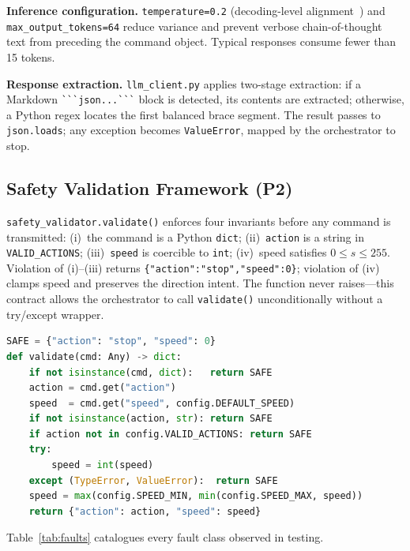 \documentclass[conference]{IEEEtran}
\begin{document}
\textbf{Inference configuration.}
\texttt{temperature=0.2} (decoding-level alignment~\cite{wei2022cot}) and
\texttt{max\_output\_tokens=64} reduce variance and prevent verbose
chain-of-thought text from preceding the command object.
Typical responses consume fewer than 15 tokens.

\textbf{Response extraction.}
\texttt{llm\_client.py} applies two-stage extraction: if a Markdown
\verb|```json...```| block is detected, its contents are extracted; otherwise,
a Python regex locates the first balanced brace segment.
The result passes to \texttt{json.loads}; any exception becomes
\texttt{ValueError}, mapped by the orchestrator to stop.

\subsection{Safety Validation Framework (P2)}
\label{sec:validator}

\texttt{safety\_validator.validate()} enforces four invariants
before any command is transmitted:
(i)~the command is a Python \texttt{dict};
(ii)~\texttt{action} is a string in \texttt{VALID\_ACTIONS};
(iii)~\texttt{speed} is coercible to \texttt{int};
(iv)~speed satisfies $0 \leq s \leq 255$.
Violation of (i)--(iii) returns \texttt{\{"action":"stop","speed":0\}};
violation of (iv) clamps speed and preserves the direction intent.
The function never raises---this contract allows the orchestrator to call
\texttt{validate()} unconditionally without a try/except wrapper.

\begin{lstlisting}[language=Python, float=t, caption={Safety validator logic (safety\_validator.py)}, label={lst:validator}]
SAFE = {"action": "stop", "speed": 0}
def validate(cmd: Any) -> dict:
    if not isinstance(cmd, dict):   return SAFE
    action = cmd.get("action")
    speed  = cmd.get("speed", config.DEFAULT_SPEED)
    if not isinstance(action, str): return SAFE
    if action not in config.VALID_ACTIONS: return SAFE
    try:
        speed = int(speed)
    except (TypeError, ValueError):  return SAFE
    speed = max(config.SPEED_MIN, min(config.SPEED_MAX, speed))
    return {"action": action, "speed": speed}
\end{lstlisting}

Table~\ref{tab:faults} catalogues every fault class observed in testing.
\end{document}
